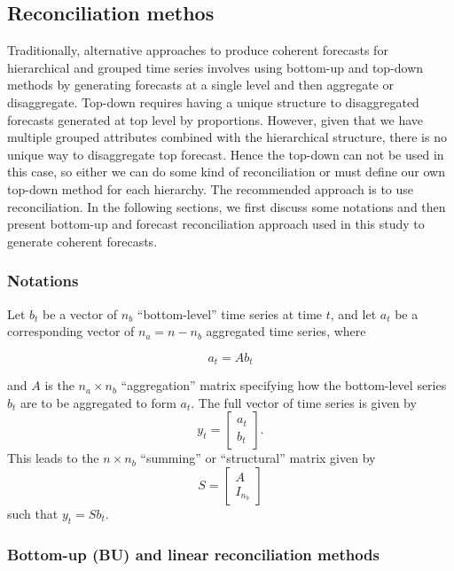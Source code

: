 \documentclass[
  authoryear,
  preprint,
  3p]{elsarticle}
\begin{document}
\hypertarget{reconciliation-methos}{%
\subsection{Reconciliation methos}\label{reconciliation-methos}}

Traditionally, alternative approaches to produce coherent forecasts for
hierarchical and grouped time series involves using bottom-up and
top-down methods by generating forecasts at a single level and then
aggregate or disaggregate. Top-down requires having a unique structure
to disaggregated forecasts generated at top level by proportions.
However, given that we have multiple grouped attributes combined with
the hierarchical structure, there is no unique way to disaggregate top
forecast. Hence the top-down can not be used in this case, so either we
can do some kind of reconciliation or must define our own top-down
method for each hierarchy. The recommended approach is to use
reconciliation. In the following sections, we first discuss some
notations and then present bottom-up and forecast reconciliation
approach used in this study to generate coherent forecasts.

\hypertarget{notations}{%
\subsubsection{Notations}\label{notations}}

Let \(b_t\) be a vector of \(n_b\) ``bottom-level'' time series at time
\(t\), and let \(a_t\) be a corresponding vector of \(n_a = n-n_b\)
aggregated time series, where

\[
 a_t = Ab_t
\]

and \(A\) is the \(n_a\times n_b\) ``aggregation'' matrix specifying how
the bottom-level series \(b_t\) are to be aggregated to form \(a_t\).
The full vector of time series is given by \[
 y_t = \begin{bmatrix}a_t \\b_t\end{bmatrix}.
\] This leads to the \(n\times n_b\) ``summing'' or ``structural''
matrix given by \[
  S = \begin{bmatrix}A \\ I_{n_b}\end{bmatrix}
\] such that \(y_t = Sb_t\).

\hypertarget{bottom-up-bu-and-linear-reconciliation-methods}{%
\subsubsection{Bottom-up (BU) and linear reconciliation
methods}\label{bottom-up-bu-and-linear-reconciliation-methods}}
\end{document}
